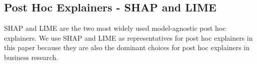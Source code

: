 \documentclass[mnsc,blindrev]{informs3}
\begin{document}
    \subsection{Post Hoc Explainers - SHAP and LIME}
     SHAP \citep{lundberg17shap} and LIME \citep{ribeiro16lime}  are the two most widely used model-agnostic post hoc explainers. %
        We use SHAP and LIME as representatives for post hoc explainers in this paper because they are also the dominant choices for post hoc explainers in business research.

        
\end{document}
